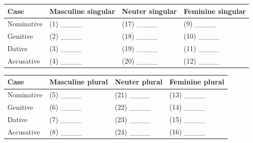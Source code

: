 \begin{minipage}{\linewidth}
\par\begingroup
\fontsize{10.5}{13.2}\selectfont
\setlength{\LTleft}{0pt}\setlength{\LTright}{\fill}
\noindent
\begin{tabular}{@{}>{\raggedright\arraybackslash}p{22.0mm}>{\raggedright\arraybackslash}p{31.188mm}>{\raggedright\arraybackslash}p{31.188mm}>{\raggedright\arraybackslash}p{31.188mm}@{}}
\toprule
\textbf{Case} & \textbf{Masculine singular} & \textbf{Neuter singular} & \textbf{Feminine singular} \\
\midrule
Nominative & (1) \_\_\_\_ & (17) \_\_\_\_ & (9) \_\_\_\_ \\
Genitive & (2) \_\_\_\_ & (18) \_\_\_\_ & (10) \_\_\_\_ \\
Dative & (3) \_\_\_\_ & (19) \_\_\_\_ & (11) \_\_\_\_ \\
Accusative & (4) \_\_\_\_ & (20) \_\_\_\_ & (12) \_\_\_\_ \\
\bottomrule
\end{tabular}
\par\endgroup
\par\addvspace{5pt}
\par\begingroup
\fontsize{10.5}{13.2}\selectfont
\setlength{\LTleft}{0pt}\setlength{\LTright}{\fill}
\noindent
\begin{tabular}{@{}>{\raggedright\arraybackslash}p{22.0mm}>{\raggedright\arraybackslash}p{31.188mm}>{\raggedright\arraybackslash}p{31.188mm}>{\raggedright\arraybackslash}p{31.188mm}@{}}
\toprule
\textbf{Case} & \textbf{Masculine plural} & \textbf{Neuter plural} & \textbf{Feminine plural} \\
\midrule
Nominative & (5) \_\_\_\_ & (21) \_\_\_\_ & (13) \_\_\_\_ \\
Genitive & (6) \_\_\_\_ & (22) \_\_\_\_ & (14) \_\_\_\_ \\
Dative & (7) \_\_\_\_ & (23) \_\_\_\_ & (15) \_\_\_\_ \\
Accusative & (8) \_\_\_\_ & (24) \_\_\_\_ & (16) \_\_\_\_ \\
\bottomrule
\end{tabular}
\par\endgroup


\end{minipage}

